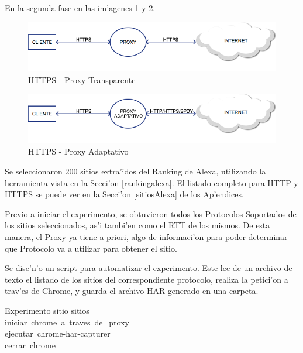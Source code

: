 En la segunda fase en las im'agenes \ref{httpsNormal} y \ref{httpsOptimizado}.

\begin{figure}[h]
  	\centering
	\includegraphics[width=\textwidth]{img/httpsNormal}
	\caption{\small HTTPS - Proxy Transparente}
	\label{httpsNormal}
\end{figure}

\begin{figure}[h]
  	\centering
	\includegraphics[width=\textwidth]{img/httpsOptimizado}
	\caption{\small HTTPS - Proxy Adaptativo}
	\label{httpsOptimizado}
\end{figure}

Se seleccionaron 200 sitios extra'idos del Ranking de Alexa, utilizando la herramienta vista en la Secci'on \ref{rankingalexa}. El listado completo para HTTP y HTTPS se puede ver en la Secci'on \ref{sitiosAlexa} de los Ap'endices.

Previo a iniciar el experimento, se obtuvieron todos los Protocolos Soportados de los sitios seleccionados, as'i tambi'en como el RTT de los mismos. De esta manera, el Proxy ya tiene a priori, algo de informaci'on para poder determinar que Protocolo va a utilizar para obtener el sitio.

Se dise'n'o un script para automatizar el experimento. Este lee de un archivo de texto el listado de los sitios del correspondiente protocolo, realiza la petici'on a trav'es de Chrome, y guarda el archivo HAR generado en una carpeta.

\begin{pseudocode}{Experimento}{ }
\BEGIN
	\FOR sitio \in sitios \DO \\
	\BEGIN
		iniciar\ chrome\ a\ traves\ del\ proxy\\
		ejecutar\ chrome-har-capturer\\
		cerrar\ chrome\\
	\END
\END
\end{pseudocode}

